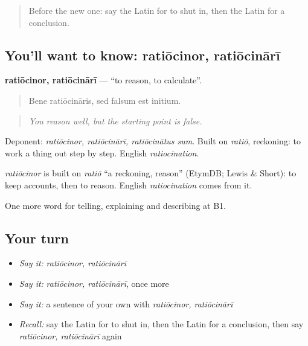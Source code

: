 \begin{quote}
Before the new one: say the Latin for to shut in, then the Latin for a conclusion.
\end{quote}

\subsection*{You'll want to know: ratiōcinor, ratiōcinārī}
\textbf{ratiōcinor, ratiōcinārī} — \textquotedblleft{}to reason, to calculate\textquotedblright{}.

\begin{quote}
Bene ratiōcināris, sed falsum est initium.
\end{quote}

\begin{quote}
\emph{You reason well, but the starting point is false.}
\end{quote}

Deponent: \emph{ratiōcinor, ratiōcinārī, ratiōcinātus sum}. Built on \emph{ratiō}, reckoning: to work a thing out step by step. English \emph{ratiocination}.

\begin{cousinweb}
\emph{ratiōcinor} is built on \emph{ratiō} \textquotedblleft{}a reckoning, reason\textquotedblright{} (EtymDB; Lewis \& Short): to keep accounts, then to reason. English \emph{ratiocination} comes from it.
\end{cousinweb}

\begin{grammarlens}[title={What you've built}]
One more word for telling, explaining and describing at B1.
\end{grammarlens}

\subsection*{Your turn}
\begin{itemize}
\raggedright
  \item \emph{Say it:} \emph{ratiōcinor, ratiōcinārī}
  \item \emph{Say it:} \emph{ratiōcinor, ratiōcinārī}, once more
  \item \emph{Say it:} a sentence of your own with \emph{ratiōcinor, ratiōcinārī}
  \item \emph{Recall:} say the Latin for to shut in, then the Latin for a conclusion, then say \emph{ratiōcinor, ratiōcinārī} again
\end{itemize}

